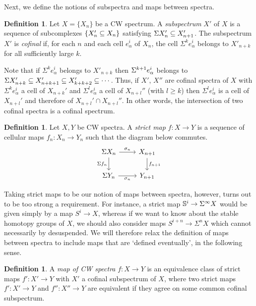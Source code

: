 \documentclass[11pt, titlepage]{article} %
\def\bb{\ensuremath\mathbb}
\def\subq{\ensuremath\subseteq}
\def\SIgma{\ensuremath\Sigma}
\numberwithin{equation}{subsection}
\theoremstyle{plain}
\theoremstyle{definition}
\newtheorem{definition}[theorem]{Definition}
\begin{document}
Next, we define the notions of subspectra and maps between spectra.

\begin{definition}
Let \(X=\{X_n\}\) be a CW spectrum. A \textit{subspectrum} \(X'\) of \(X\) is a sequence of subcomplexes \(\{X_n'\subq X_n\}\) satisfying \(\Sigma X_n'\subq X_{n+1}'\). The subspectrum \(X'\) is \textit{cofinal} if, for each \(n\) and each cell \(e^i_\alpha\) of \(X_n\), the cell \(\Sigma^k e_\alpha^i\) belongs to \(X'_{n+k}\) for all sufficiently large \(k\).
\end{definition}

Note that if \(\Sigma^ke^i_\alpha\) belongs to \(X'_{n+k}\) then \(\SIgma^{k+1}e^i_\alpha\) belongs to \(\Sigma X'_{n+k}\subq X'_{n+k+1}\subq X'_{k+k+2}\subq \cdots\). Thus, if \(X'\), \(X''\) are cofinal spectra of \(X\) with \(\Sigma^k e_{\alpha}^i\) a cell of \(X_{n+k}'\) and \(\Sigma^l e_\alpha^i\) a cell of \(X_{n+l}''\) (with \(l\geq k\)) then \(\Sigma^l e_\alpha^i\) is a cell of \(X_{n+l}'\) and therefore of \(X_{n+l}'\cap X_{n+l}''\). In other words, the intersection of two cofinal spectra is a cofinal spectrum.

\begin{definition}
Let \(X, Y\) be CW spectra. A \textit{strict map} \(f : X \to Y\) is a sequence of cellular maps \(f_n : X_n \to Y_n\) such that the diagram below commutes.
\[\begin{tikzcd}
\Sigma X_n \arrow[r, "\sigma_n"] \arrow[d, swap, "\Sigma f_n"]  & X_{n+1} \arrow[d, "f_{n+1}"]  \\
\SIgma Y_n \arrow[r, swap, "\sigma_n"]  & Y_{n+1}
\end{tikzcd}\]
\end{definition}

Taking strict maps to be our notion of maps between spectra, however, turns out to be too strong a requirement. For instance, a strict map \(\bb{S}^i \to \Sigma^\infty X\) would be given simply by a map \(S^i \to X\), whereas if we want to know about the stable homotopy groups of \(X\), we should also consider maps \(S^{i+n}\to \Sigma^n X\) which cannot necessarily by desuspended. We will therefore relax the definition of maps between spectra to include maps that are `defined eventually', in the following sense. 

\begin{definition}
A \textit{map of CW spectra} \(f : X \to Y\) is an equivalence class of strict maps \(f' : X' \to Y\) with \(X'\) a cofinal subspectrum of \(X\), where two strict maps \(f' : X' \to Y\) and \(f'' : X'' \to Y\) are equivalent if they agree on some common cofinal subspectrum. 
\end{definition}
\end{document}
